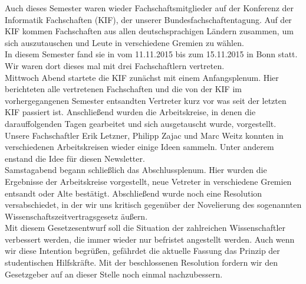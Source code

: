 Auch dieses Semester waren wieder Fachschaftsmitglieder auf der Konferenz der Informatik Fachschaften (KIF), der unserer Bundesfachschaftentagung. Auf der KIF kommen Fachschaften aus allen deutschsprachigen Ländern zusammen, um sich auszutauschen und Leute in verschiedene Gremien zu wählen.\\
In diesem Semester fand sie in vom 11.11.2015 bis zum 15.11.2015 in Bonn statt. Wir waren dort dieses mal mit drei Fachschaftlern vertreten.\\
Mittwoch Abend startete die KIF zunächst mit einem Anfangsplenum. Hier berichteten alle vertretenen Fachschaften und die von der KIF im vorhergegangenen Semester entsandten Vertreter kurz vor was seit der letzten KIF passiert ist. Anschließend wurden die Arbeitskreise, in denen die darauffolgenden Tagen gearbeitet und sich ausgetauscht wurde, vorgestellt.\\
Unsere Fachschaftler Erik Letzner, Philipp Zajac und Marc Weitz konnten in verschiedenen Arbeitskreisen wieder einige Ideen sammeln. Unter anderem enstand die Idee für diesen Newsletter.\\
Samstagabend begann schließlich das Abschlussplenum. Hier wurden die Ergebnisse der Arbeitskreise vorgestellt, neue Vetreter in verschiedene Gremien entsandt oder Alte bestätigt. Abschließend wurde noch eine Resolution versabschiedet, in der wir uns kritisch gegenüber der Novelierung des sogenannten Wissenschaftszeitvertragsgesetz äußern.\\
Mit diesem Gesetzesentwurf soll die Situation der zahlreichen Wissenschaftler verbessert werden, die immer wieder nur befristet angestellt werden. Auch wenn wir diese Intention begrüßen, gefährdet die aktuelle Fassung das Prinzip der studentischen Hilfskräfte. Mit der beschlossenen Resolution fordern wir den Gesetzgeber auf an dieser Stelle noch einmal nachzubessern.


